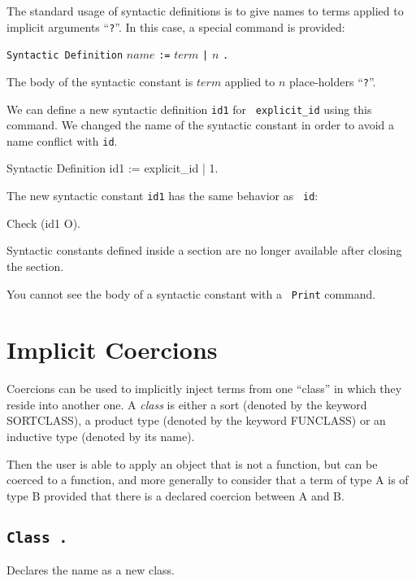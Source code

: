 \begin{coq_example}
The standard usage of syntactic definitions is to give names to terms
applied to implicit arguments ``\verb+?+''. In this case, a special
command is provided:

\begin{center}
\verb+Syntactic Definition+ $name$ \verb+:=+ $term$ \verb+|+ $n$ \verb+.+ \\
\end{center}

\noindent The body of the syntactic constant is $term$ applied to $n$
place-holders ``\verb+?+''.

We can define a new syntactic definition {\tt id1} for {\tt
  explicit\_id} using this command. We changed the name of the
syntactic constant in order to avoid a name conflict with {\tt id}.

\begin{coq_example}
Syntactic Definition id1 := explicit_id | 1.
\end{coq_example}

The new syntactic constant {\tt id1} has the same behavior as {\tt
  id}:

\begin{coq_example}
Check (id1 O).
\end{coq_example}


\begin{Warnings}
\item Syntactic constants defined inside a section are no longer
  available after closing the section.
\item You cannot see the body of a syntactic constant with a {\tt
    Print} command.
\end{Warnings}

\section{Implicit Coercions}
\label{Coercions}

Coercions can be used to implicitly inject terms from one ``class'' in
which they reside into another one. A {\em class} is either a sort
(denoted by the keyword SORTCLASS), a product type (denoted by the
keyword FUNCLASS) or an inductive type (denoted by its name).

Then the user is able to apply an
object that is not a function, but can be coerced to a function, and
more generally to consider that a term of type A is of type B provided
that there is a declared coercion between A and B.

\subsection{\tt Class {\ident}.}
Declares the name {\ident} as a new class.


\end{coq_example}
